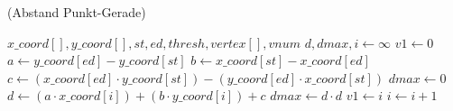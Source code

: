 \begin{algorithm}[!ht]\small
\caption{ (Abstand Punkt-Gerade)}
\label{alg:getvertex-1}
\begin{algorithmic}[1]
	\Require $\mathit{x\_coord}[], \mathit{y\_coord}[], \mathit{st}, \mathit{ed}, \mathit{thresh}, \mathit{vertex}[],
	 \mathit{vnum}$
	\State $d, \mathit{dmax}, i \gets \infty$
	\label{alg:getvertex-1-init-start}
	\State $\mathit{v1} \gets 0$
	\label{alg:getvertex-1-init-end}
	\State $a \gets \mathit{y\_coord}[ed] - \mathit{y\_coord}[st]$
	\label{alg:getvertex-1-line-start}
	\State $b \gets \mathit{x\_coord}[st] - \mathit{x\_coord}[ed]$
	\State $c \gets \left(\mathit{x\_coord}[ed] \cdot \mathit{y\_coord}[st]\right) - \left(\mathit{y\_coord}[ed] \cdot
	 \mathit{x\_coord}[st]\right)$
	\label{alg:getvertex-1-line-end}
	\State $\mathit{dmax} \gets 0$
	\label{alg:getvertex-1-loop-start}
		\State $d \gets \left(a \cdot \mathit{x\_coord}[i]\right) + \left(b \cdot \mathit{y\_coord}[i]\right) + c$
			\State $\mathit{dmax} \gets d \cdot d$
			\label{alg:getvertex-1-savedmax}
			\State $\mathit{v1} \gets i$
		\EndIf
		\State $i \gets i + 1$
	\EndFor
	\label{alg:getvertex-1-loop-end}
\end{algorithmic}
\end{algorithm}
